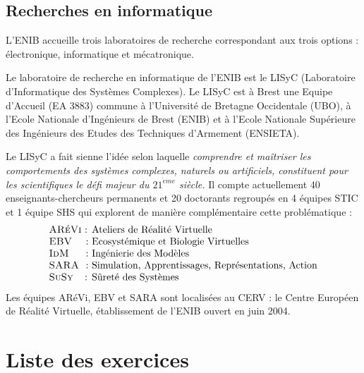 \subsection*{Recherches en informatique}
L'ENIB accueille trois laboratoires de recherche correspondant aux trois options :
électronique, informatique et mécatronique.

Le laboratoire de recherche en informatique de l'ENIB est le {\sc LISyC} 
(Laboratoire d'Informatique des Systèmes Complexes).
Le {\sc LISyC} est à Brest une Equipe d'Accueil (EA 3883) commune à l'Université de Bretagne Occidentale (UBO), 
à l'Ecole Nationale d'Ingénieurs de Brest (ENIB) et à l'Ecole Nationale Supérieure des Ingénieurs 
des Etudes des Techniques d'Armement (ENSIETA).

Le {\sc LISyC} a fait sienne l'idée selon laquelle 
{\em
comprendre et maîtriser les comportements des systèmes complexes,
naturels ou artificiels, constituent pour les scientifiques le défi majeur
du $21^{\grave eme}$ siècle.
}
Il compte actuellement 40 enseignants-chercheurs permanents et 20 doctorants
regroupés en 4 équipes STIC et 1 équipe SHS qui explorent de manière complémentaire
cette problématique :
$$\begin{tabular}{l@{ : }l}
{\sc ARéVi} & Ateliers de Réalité Virtuelle \\
{\sc EBV} & Ecosystémique et Biologie Virtuelles \\
{\sc IdM} & Ingénierie des Modèles \\
{\sc SARA} & Simulation, Apprentissages, Représentations, Action \\
{\sc SuSy} & Sûreté des Systèmes
\end{tabular}$$
Les équipes {\sc ARéVi}, {\sc EBV} et {\sc SARA} sont localisées au {\sc CERV} :
le Centre Européen de Réalité Virtuelle, établissement de l'ENIB ouvert en juin 2004.


\newpage
\section*{Liste des exercices}\label{sub:listexo}
